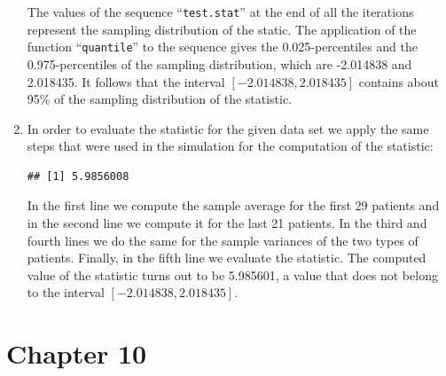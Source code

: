 \documentclass[]{krantz}
\makeatletter
\newenvironment{Shaded}{\begin{snugshade}}{\end{snugshade}}
\newcommand{\DecValTok}[1]{\textcolor[rgb]{0.00,0.00,0.81}{#1}}
\newcommand{\KeywordTok}[1]{\textcolor[rgb]{0.13,0.29,0.53}{\textbf{#1}}}
\newcommand{\NormalTok}[1]{#1}
\newcommand{\OperatorTok}[1]{\textcolor[rgb]{0.81,0.36,0.00}{\textbf{#1}}}
\newcommand{\StringTok}[1]{\textcolor[rgb]{0.31,0.60,0.02}{#1}}
\newenvironment{kframe}{%
\medskip{}
\setlength{\fboxsep}{.8em}
 \def\at@end@of@kframe{}%
 \ifinner\ifhmode%
  \def\at@end@of@kframe{\end{minipage}}%
  \begin{minipage}{\columnwidth}%
 \fi\fi%
 \def\FrameCommand##1{\hskip\@totalleftmargin \hskip-\fboxsep
 \colorbox{shadecolor}{##1}\hskip-\fboxsep
     \hskip-\linewidth \hskip-\@totalleftmargin \hskip\columnwidth}%
 \MakeFramed {\advance\hsize-\width
   \@totalleftmargin\z@ \linewidth\hsize
   \@setminipage}}%
 {\par\unskip\endMakeFramed%
 \at@end@of@kframe}
\renewenvironment{Shaded}{\begin{kframe}}{\end{kframe}}
\theoremstyle{definition}
\theoremstyle{definition}
\theoremstyle{definition}
\theoremstyle{remark}
\makeatother
\begin{document}
\begin{enumerate}
  The values of the sequence ``\texttt{test.stat}'' at the end of all the
  iterations represent the sampling distribution of the static. The
  application of the function ``\texttt{quantile}'' to the sequence gives the
  0.025-percentiles and the 0.975-percentiles of the sampling
  distribution, which are -2.014838 and 2.018435. It follows that the
  interval \([-2.014838, 2.018435]\) contains about 95\% of the sampling
  distribution of the statistic.
\item
  In order to evaluate the statistic
  for the given data set we apply the same steps that were used in the
  simulation for the computation of the statistic:

\begin{Shaded}
\end{Shaded}

\begin{verbatim}
## [1] 5.9856008
\end{verbatim}

  In the first line we compute the sample average for the first 29
  patients and in the second line we compute it for the last 21 patients.
  In the third and fourth lines we do the same for the sample variances of
  the two types of patients. Finally, in the fifth line we evaluate the
  statistic. The computed value of the statistic turns out to be 5.985601,
  a value that does not belong to the interval \([-2.014838, 2.018435]\).
\end{enumerate}

\hypertarget{chapter-10}{%
\section*{Chapter 10}\label{chapter-10}}
\end{document}
